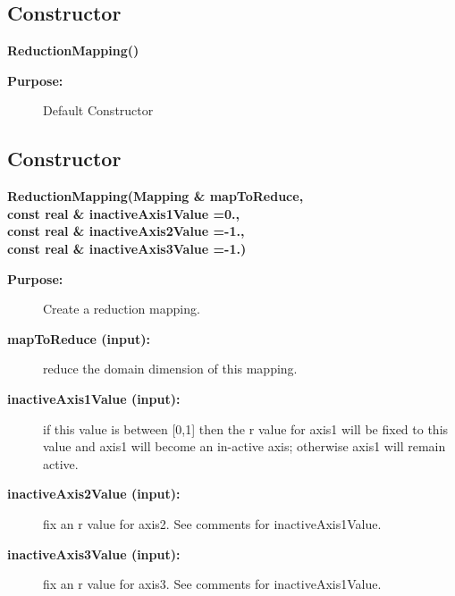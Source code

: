 \subsection{Constructor}
 
\newlength{\ReductionMappingIncludeArgIndent}
\begin{flushleft} \textbf{%
\settowidth{\ReductionMappingIncludeArgIndent}{ReductionMapping(}%
ReductionMapping() 
}\end{flushleft}
\begin{description}
\item[{\bf Purpose:}]  Default Constructor
\end{description}
\subsection{Constructor}
 
\begin{flushleft} \textbf{%
\settowidth{\ReductionMappingIncludeArgIndent}{ReductionMapping(}%
ReductionMapping(Mapping \& mapToReduce, \\ 
\hspace{\ReductionMappingIncludeArgIndent}const real \& inactiveAxis1Value  =0.,\\ 
\hspace{\ReductionMappingIncludeArgIndent}const real \& inactiveAxis2Value  =-1.,\\ 
\hspace{\ReductionMappingIncludeArgIndent}const real \& inactiveAxis3Value  =-1.)
}\end{flushleft}
\begin{description}
\item[{\bf Purpose:}]  Create a reduction mapping.

\item[{\bf mapToReduce (input):}]  reduce the domain dimension of this mapping.
\item[{\bf inactiveAxis1Value (input):}]  if this value is between [0,1] then the r value
      for axis1 will be fixed to this value and axis1 will become an in-active axis;
       otherwise axis1 will remain active.
\item[{\bf inactiveAxis2Value (input):}]  fix an r value for axis2. See comments for inactiveAxis1Value.
\item[{\bf inactiveAxis3Value (input):}]  fix an r value for axis3. See comments for inactiveAxis1Value.

\end{description}
